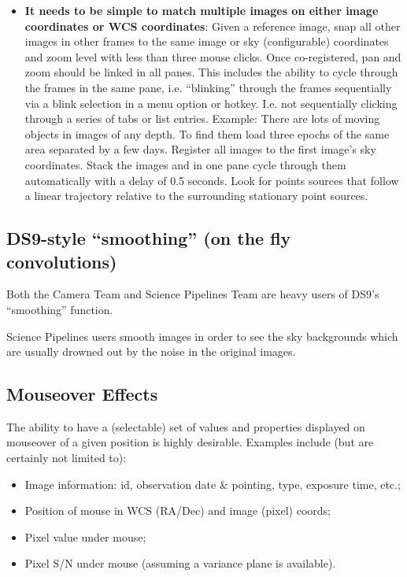\begin{itemize}
\item \textbf{It needs to be simple to match multiple images on either image coordinates or WCS coordinates}:
Given a reference image, snap all other images in other frames to the same image or sky (configurable) coordinates and zoom level with less than three mouse clicks.
Once co-registered, pan and zoom should be linked in all panes.
This includes the ability to cycle through the frames in the same pane, i.e. ``blinking'' through the frames sequentially via a blink selection in a menu option or hotkey.  I.e. not sequentially clicking through a series of tabs or list entries.
Example: There are lots of moving objects in images of any depth.  To find them load three epochs of the same area separated by a few days.  Register all images to the first image's sky coordinates.  Stack the images and in one pane cycle through them automatically with a delay of 0.5 seconds.  Look for points sources that follow a linear trajectory relative to the surrounding stationary point sources.
\end{itemize}

\subsection{DS9-style ``smoothing'' (on the fly convolutions)}

Both the Camera Team and Science Pipelines Team are heavy users of DS9's ``smoothing'' function.

Science Pipelines users smooth images in order to see the sky backgrounds which are usually drowned out by the noise in the original images.


\subsection{Mouseover Effects}
The ability to have a (selectable) set of values and properties displayed on mouseover of a given position is highly desirable.  Examples include (but are certainly not limited to):
\begin{itemize}
\item{Image information: id, observation date \& pointing, type, exposure time, etc.;}
\item{Position of mouse in WCS (RA/Dec) and image (pixel) coords;}
\item{Pixel value under mouse;}
\item{Pixel S/N under mouse (assuming a variance plane is available).}
\end{itemize}

